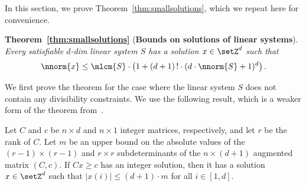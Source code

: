 

In this section, we prove Theorem~\ref{thm:smallsolutions}, which we
repeat here for convenience.

\medskip
\noindent
	\textbf{Theorem~\ref{thm:smallsolutions}} (\textbf{Bounds on solutions of linear
	systems}).
\hfill\\
	\emph{
Every satisfiable $d$-dim linear system $S$ 
 has a solution $x\in\setZ^d$ such that
	\[\nnorm{x}\leq
		\mlcm{S} \cdot \left(1+ (d+1)\,!\cdot (d\cdot
		\nnorm{S}+1)^{d}\right).\]
}
\medskip


We first prove the theorem for the case where the linear system $S$
	does not contain any divisibility constraints. We use the
	following result, which is a weaker form of the theorem from~\cite{Gathen1978}.

	\begin{lemC}\label{lem:Gathen}
Let $C$ and $c$ be $n\times d$ and $n\times 1$ integer matrices, respectively,
and let $r$ be the rank of $C$. Let $m$ be an
	upper bound on the absolute values of the $(r-1)\times (r-1)$
	and $r\times r$ subdeterminants of the $n\times (d+1)$
	augmented matrix
	$(C, c)$. If $Cx\geq c$ has an integer solution, then it has
	a solution $x\in \setZ^d$ such that $|x(i)|\leq (d+1)\cdot m$ for
	all $i\in [1,d]$.
\end{lemC}

